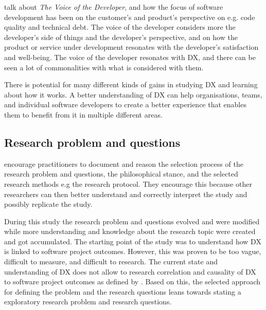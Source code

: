 \documentclass[english, 12pt, a4paper, sci, utf8, a-1b, online]{aaltothesis}
\begin{document}
\textcite{voice-of-the-developer} talk about \textit{The Voice of the Developer}, and how the focus of software development has been on the customer's and product's perspective on e.g. code quality and technical debt. The voice of the developer considers more the developer's side of things and the developer's perspective, and on how the product or service under development resonates with the developer's satisfaction and well-being. The voice of the developer resonates with DX, and there can be seen a lot of commonalities with what is considered with them.

There is potential for many different kinds of gains in studying DX and learning about how it works. A better understanding of DX can help organisations, teams, and individual software developers to create a better experience that enables them to benefit from it in multiple different areas.


\subsection{Research problem and questions} \label{section:research-problem-and-questions}

\textcite{easterbrook2008selecting} encourage practitioners to document and reason the selection process of the research problem and questions, the philosophical stance, and the selected research methods e.g the research protocol. They encourage this because other researchers can then better understand and correctly interpret the study and possibly replicate the study.

During this study the research problem and questions evolved and were modified while more understanding and knowledge about the research topic were created and got accumulated. The starting point of the study was to understand how DX is linked to software project outcomes. However, this was proven to be too vague, difficult to measure, and difficult to research. The current state and understanding of DX does not allow to research correlation and causality of DX to software project outcomes as defined by \textcite{easterbrook2008selecting}. Based on this, the selected approach for defining the problem and the research questions leans towards stating a exploratory research problem and research questions.
\end{document}
